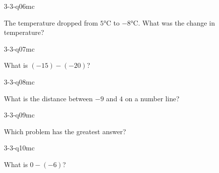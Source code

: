 \begin{practiceQuestion}{3-3-q06}{mc}
\begin{questionText}
The temperature dropped from $5°$C to $-8°$C. What was the change in temperature?
\end{questionText}
\end{practiceQuestion}

\begin{practiceQuestion}{3-3-q07}{mc}
\begin{questionText}
What is $(-15) - (-20)$?
\end{questionText}
\end{practiceQuestion}

\begin{practiceQuestion}{3-3-q08}{mc}
\begin{questionText}
What is the distance between $-9$ and $4$ on a number line?
\end{questionText}
\end{practiceQuestion}

\begin{practiceQuestion}{3-3-q09}{mc}
\begin{questionText}
Which problem has the greatest answer?
\end{questionText}
\end{practiceQuestion}

\begin{practiceQuestion}{3-3-q10}{mc}
\begin{questionText}
What is $0 - (-6)$?
\end{questionText}
\end{practiceQuestion}

